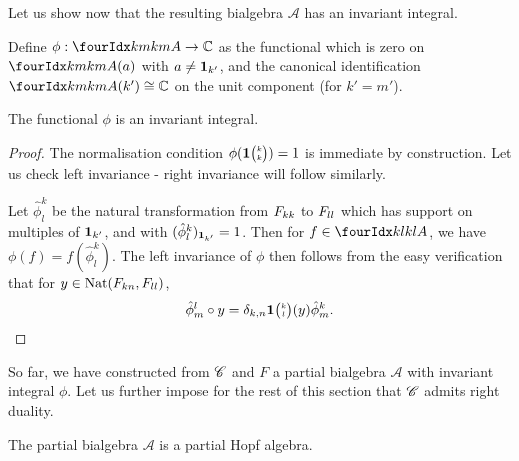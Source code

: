 Let us show now that the resulting bialgebra $\mathscr{A}$ has an invariant integral.

\begin{Def} Define $\phi: \Gr{A}{k}{k}{m}{m} \rightarrow \C$ as the functional which is zero on $\Gr{A}{k}{k}{m}{m}(a)$ with $a\neq \mathbf{1}_{k'}$, and the canonical identification $\Gr{A}{k}{k}{m}{m}(k')\cong \C$ on the unit component (for $k'=m'$).
\end{Def}

\begin{Lem} The functional $\phi$ is an invariant integral.
\end{Lem}

\begin{proof} The normalisation condition $\phi(\mathbf{1}{\tiny {\begin{pmatrix} k\\k\end{pmatrix}}})=1$ is immediate by construction. Let us check left invariance - right invariance will follow similarly.

Let $\hat{\phi}^k_l$ be the natural transformation from $F_{kk}$ to $F_{ll}$ which has support on multiples of $\mathbf{1}_{k'}$, and with $(\hat{\phi}^k_l)_{\mathbf{1}_{k'}} = 1$.  Then for $f\in \Gr{A}{k}{k}{l}{l}$, we have $\phi(f) = f(\hat{\phi}^k_l)$. The left invariance of $\phi$ then follows from the easy verification that for $y\in \operatorname{\mathrm{Nat}}(F_{kn},F_{ll})$, \[\hat{\phi}^l_m\circ y =\delta_{k,n} \mathbf{1}{\tiny {\begin{pmatrix} k\\l\end{pmatrix}}}(y)\hat{\phi}^k_m.\] %
\end{proof}

So far, we have constructed from $\mathscr{C}$ and $F$ a partial bialgebra $\mathscr{A}$ with invariant integral $\phi$. Let us further impose for the rest of this section that $\mathscr{C}$ admits right duality.

\begin{Prop} The partial bialgebra $\mathscr{A}$ is a partial Hopf algebra.
\end{Prop} 

